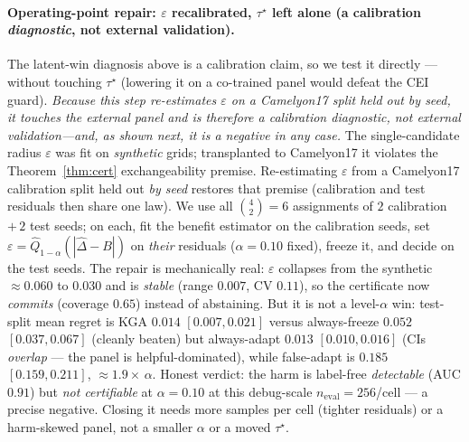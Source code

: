 \documentclass[conference]{IEEEtran}
\theoremstyle{plain}
\theoremstyle{definition}
\begin{document}
\paragraph{Operating-point repair: $\varepsilon$ recalibrated, $\tau^\star$ left alone (a calibration \emph{diagnostic}, not external validation).}
The latent-win diagnosis above is a calibration claim, so we test it directly --- without
touching $\tau^\star$ (lowering it on a co-trained panel would defeat the CEI guard). \emph{Because
this step re-estimates $\varepsilon$ on a Camelyon17 split held out by seed, it touches the external
panel and is therefore a calibration diagnostic, not external validation---and, as shown next, it is
a negative in any case.} The
single-candidate radius $\varepsilon$ was fit on \emph{synthetic} grids; transplanted to
Camelyon17 it violates the Theorem~\ref{thm:cert} exchangeability premise. Re-estimating
$\varepsilon$ from a Camelyon17 calibration split held out \emph{by seed} restores that premise
(calibration and test residuals then share one law). We use all $\binom{4}{2}{=}6$ assignments of
$2$ calibration $+\,2$ test seeds; on each, fit the benefit estimator on the calibration seeds,
set $\varepsilon{=}\widehat{Q}_{1-\alpha}(|\widehat\Delta-B|)$ on \emph{their} residuals
($\alpha{=}0.10$ fixed), freeze it, and decide on the test seeds. The repair is mechanically
real: $\varepsilon$ collapses from the synthetic $\approx0.060$ to $0.030$ and is \emph{stable}
(range $0.007$, CV $0.11$), so the certificate now \emph{commits} (coverage $0.65$) instead of
abstaining. But it is not a level-$\alpha$ win: test-split mean regret is \textsc{KGA} $0.014$
$[0.007,0.021]$ versus always-freeze $0.052$ $[0.037,0.067]$ (cleanly beaten) but always-adapt
$0.013$ $[0.010,0.016]$ (CIs \emph{overlap} --- the panel is helpful-dominated), while
false-adapt is $0.185$ $[0.159,0.211]$, $\approx\!1.9{\times}\,\alpha$. Honest verdict: the harm
is label-free \emph{detectable} (AUC $0.91$) but \emph{not certifiable} at $\alpha{=}0.10$ at this
debug-scale $n_{\mathrm{eval}}{=}256$/cell --- a precise negative. Closing it needs more samples
per cell (tighter residuals) or a harm-skewed panel, not a smaller $\alpha$ or a moved $\tau^\star$.
\end{document}
